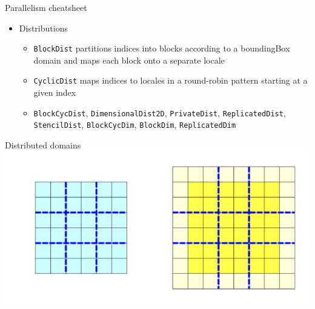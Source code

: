 \documentclass[10pt,xcolor=pdftex,dvipsnames,table]{beamer}
\newcommand{\tc}{\textcolor}
\begin{document}
\begin{frame}{Parallelism cheatsheet}
{\begin{itemize}
{\begin{itemize}
        \item \tc{Mahogany}{\texttt{locale.name}} is a locale's name
        \item \tc{Mahogany}{\texttt{here}} evaluates to the locale on which the current task is running
        \end{itemize}}
    \item Distributions
      {\let\small\scriptsize
        \begin{itemize}\setlength{\itemsep}{0.1mm}
        \item \tc{Mahogany}{\texttt{BlockDist}} partitions indices into blocks according to a boundingBox
          domain and maps each block onto a separate locale
        \item \tc{Mahogany}{\texttt{CyclicDist}} maps indices to locales in a round-robin pattern
          starting at a given index
        \item \tc{Mahogany}{\texttt{BlockCycDist}}, \tc{Mahogany}{\texttt{DimensionalDist2D}},
          \tc{Mahogany}{\texttt{PrivateDist}}, \tc{Mahogany}{\texttt{ReplicatedDist}},
          \tc{Mahogany}{\texttt{StencilDist}}, \tc{Mahogany}{\texttt{BlockCycDim}},
          \tc{Mahogany}{\texttt{BlockDim}}, \tc{Mahogany}{\texttt{ReplicatedDim}}
      \end{itemize}}
  \end{itemize}}
\end{frame}



\begin{frame}{Distributed domains}
  \includegraphics[width=1.0\columnwidth]{domains.pdf}
\end{frame}
\end{document}
